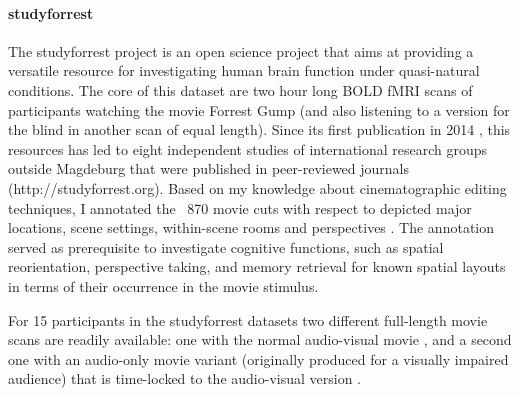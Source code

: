 \paragraph{studyforrest}
%
The studyforrest project is an open science project that aims at providing a
versatile resource for investigating human brain function under quasi-natural
conditions.
%
The core of this dataset are two hour long BOLD fMRI scans of participants
watching the movie Forrest Gump (and also listening to a version for the blind
in another scan of equal length).
%
Since its first publication in 2014 \citep{hanke2014audiomovie}, this resources
has led to eight independent studies of international research groups outside
Magdeburg that were published in peer-reviewed journals
(http://studyforrest.org).
%
Based on my knowledge about cinematographic editing techniques, I annotated the
~870 movie cuts with respect to depicted major locations, scene settings,
within-scene rooms and perspectives \citep{haeusler2016cutanno}.
%
The annotation served as prerequisite to investigate cognitive functions, such
as spatial reorientation, perspective taking, and memory retrieval for known
spatial layouts in terms of their occurrence in the movie stimulus.

For 15 participants in the studyforrest datasets two different full-length movie
scans are readily available: one with the normal audio-visual movie
\citep{hanke2016simultaneous}, and a second one with an audio-only movie variant
(originally produced for a visually impaired audience) that is time-locked to
the audio-visual version \citep{hanke2014audiomovie}.

